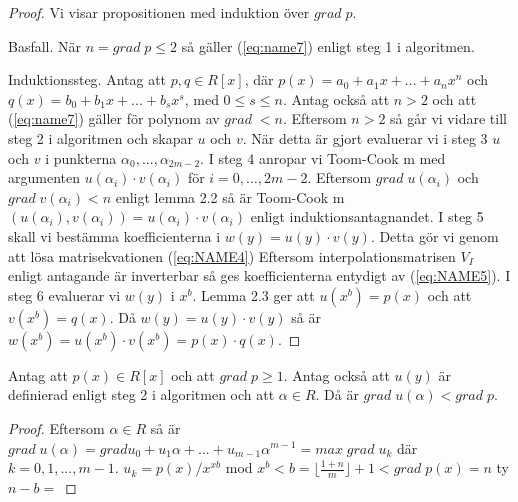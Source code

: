\begin{proof}
Vi visar propositionen med induktion över $grad \; p$.

Basfall. När $n = grad \; p \leq 2$ så gäller (\ref{eq:name7}) enligt steg 1 i algoritmen.

Induktionssteg. Antag att $p, q \in R[x]$, där $p(x)= a_0 + a_1 x + ... + a_n x^n$ och
$q(x) = b_0 + b_1 x + ... + b_s x^s$, med $0 \leq s \leq n$. Antag också att $n > 2$ och att (\ref{eq:name7}) gäller
för polynom av $grad \; < n$. Eftersom $n > 2$ så går vi vidare till steg 2 i algoritmen och skapar $u$ och $v$.
När detta är gjort evaluerar vi i steg 3 $u$ och $v$ i punkterna $\alpha_0, ...,  \alpha_{2m-2}$. I steg 4 anropar
vi Toom-Cook m med argumenten $u(\alpha_i) \cdot v(\alpha_i)$ för $i = 0, \ldots , 2m-2$. Eftersom $grad \; u(\alpha_i)$
och $grad \; v(\alpha_i) < n$ enligt lemma 2.2 så är Toom-Cook m $(u(\alpha_i), v(\alpha_i)) = u(\alpha_i) \cdot v(\alpha_i)$ enligt
induktionsantagnandet.
I steg 5 skall vi bestämma koefficienterna i $w(y)=u(y) \cdot v(y)$. Detta gör vi genom att lösa matrisekvationen (\ref{eq:NAME4})
Eftersom interpolationsmatrisen $V_I$ enligt antagande är inverterbar så ges koefficienterna entydigt av (\ref{eq:NAME5}).
I steg 6 evaluerar vi $w(y)$ i $x^b$. Lemma 2.3 ger att $u(x^b)=p(x)$ och att $v(x^b)=q(x)$. Då $w(y)=u(y) \cdot v(y)$ så är
$w(x^b)=u(x^b) \cdot v(x^b)=p(x) \cdot q(x)$.
\end{proof}

\begin{lemma}
 Antag att $p(x) \in R[x]$ och att $grad \; p \geq 1$. Antag också att $u(y)$ är definierad enligt steg 2 i algoritmen och att $\alpha \in R$.
Då är $grad \; u(\alpha) < grad \; p$.
\end{lemma}
\begin{proof}
 Eftersom $\alpha \in R$ så är $grad \; u(\alpha) = grad u_0 + u_1 \alpha + ... + u_{m-1}\alpha^{m-1} = max \; grad \; u_k$ där $k={0,1,...,m-1}$.
$u_k = p(x)/x^{xb}$ mod $x^b < b = \lfloor \frac{1 + n}{m}\rfloor + 1 < grad \; p(x) = n$ ty $n-b = $
\end{proof}

